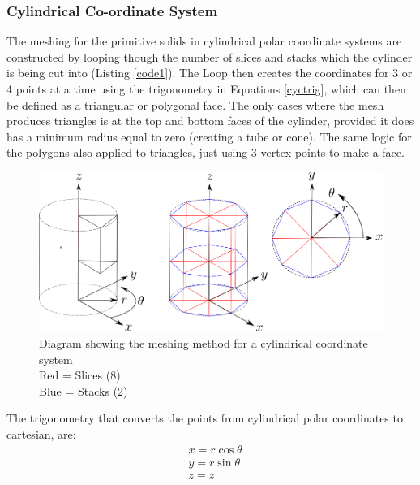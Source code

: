 \documentclass[12pt,a4paper]{article}
\begin{document}
\subsubsection{Cylindrical Co-ordinate System}
\label{cycl}
The meshing for the primitive solids in cylindrical polar coordinate systems are constructed by looping though the number of slices and stacks which the cylinder is being cut into (Listing \ref{code1}). The Loop then creates the coordinates for 3 or 4 points at a time using the trigonometry in Equations \ref{cyctrig}, which can then be defined as a triangular or polygonal face. The only cases where the mesh produces triangles is at the top and bottom faces of the cylinder, provided it does has a minimum radius equal to zero (creating a tube or cone). The same logic for the polygons also applied to triangles, just using 3 vertex points to make a face.

\begin{figure}[h!]
\centering
\includegraphics[scale=0.45]{Images//Coords//cyl.png}
\caption[width=\columnwidth]{Diagram showing the meshing method for a cylindrical coordinate system\\
Red = Slices   (8)\\
Blue = Stacks (2)}
\label{cylmeshin}
\end{figure}
\vspace{0.3cm}
The trigonometry that converts the points from cylindrical polar coordinates to cartesian, are:
\begin{equation}
\begin{aligned}
\label{cyctrig}
& x = r \cos{\theta} \\
& y = r \sin{\theta} \\
& z = z
\end{aligned}
\end{equation}
\end{document}
